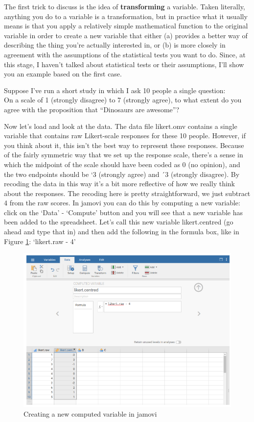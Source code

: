 \documentclass[
]{book}
\begin{document}
The first trick to discuss is the idea of \textbf{transforming} a variable. Taken literally, anything you do to a variable is a transformation, but in practice what it usually means is that you apply a relatively simple mathematical function to the original variable in order to create a new variable that either (a) provides a better way of describing the thing you're actually interested in, or (b) is more closely in agreement with the assumptions of the statistical tests you want to do. Since, at this stage, I haven't talked about statistical tests or their assumptions, I'll show you an example based on the first case.

Suppose I've run a short study in which I ask 10 people a single question:\\
On a scale of 1 (strongly disagree) to 7 (strongly agree), to what extent do you agree with the proposition that ``Dinosaurs are awesome''?

Now let's load and look at the data. The data file likert.omv contains a single variable that contains raw Likert-scale responses for these 10 people. However, if you think about it, this isn't the best way to represent these responses. Because of the fairly symmetric way that we set up the response scale, there's a sense in which the midpoint of the scale should have been coded as 0 (no opinion), and the two endpoints should be `3 (strongly agree) and ´3 (strongly disagree). By recoding the data in this way it's a bit more reflective of how we really think about the responses. The recoding here is pretty straightforward, we just subtract 4 from the raw scores. In jamovi you can do this by computing a new variable: click on the `Data' - `Compute' button and you will see that a new variable has been added to the spreadsheet. Let's call this new variable likert.centred (go ahead and type that in) and then add the following in the formula box, like in Figure \ref{fig:fig6-4}: `likert.raw - 4'

\begin{figure}
\includegraphics[width=0.9\linewidth]{images/Figure36} \caption{Creating a new computed variable in jamovi}\label{fig:fig6-4}
\end{figure}
\end{document}
